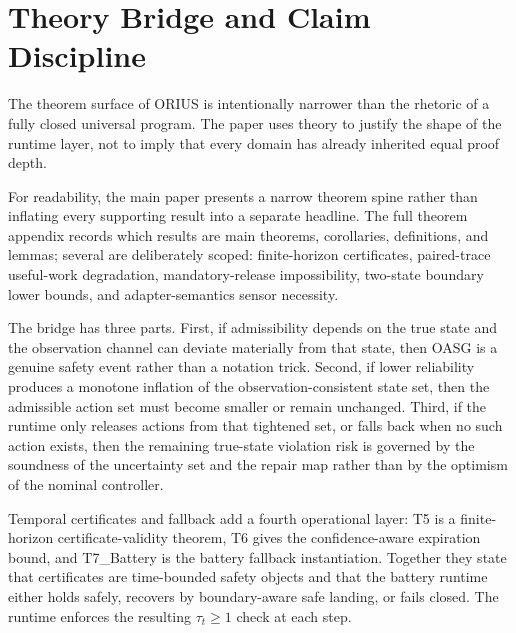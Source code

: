 \section{Theory Bridge and Claim Discipline}
\label{sec:ieee-theory}

The theorem surface of ORIUS is intentionally narrower than the rhetoric of a fully
closed universal program. The paper uses theory to justify the shape of the runtime
layer, not to imply that every domain has already inherited equal proof depth.

For readability, the main paper presents a narrow theorem spine rather than
inflating every supporting result into a separate headline. The full theorem
appendix records which results are main theorems, corollaries, definitions, and
lemmas; several are deliberately scoped: finite-horizon certificates, paired-trace
useful-work degradation, mandatory-release impossibility, two-state boundary lower
bounds, and adapter-semantics sensor necessity.

The bridge has three parts. First, if admissibility depends on the true state and the
observation channel can deviate materially from that state, then OASG is a genuine
safety event rather than a notation trick. Second, if lower reliability produces a
monotone inflation of the observation-consistent state set, then the admissible action
set must become smaller or remain unchanged. Third, if the runtime only releases actions
from that tightened set, or falls back when no such action exists, then the remaining
true-state violation risk is governed by the soundness of the uncertainty set and the
repair map rather than by the optimism of the nominal controller.

Temporal certificates and fallback add a fourth operational layer: T5 is a
finite-horizon certificate-validity theorem, T6 gives the confidence-aware
expiration bound, and T7\_Battery is the battery fallback instantiation.
Together they state that certificates are time-bounded safety objects and that
the battery runtime either holds safely, recovers by boundary-aware safe
landing, or fails closed.  The runtime enforces the resulting $\tau_t \ge 1$
check at each step.

